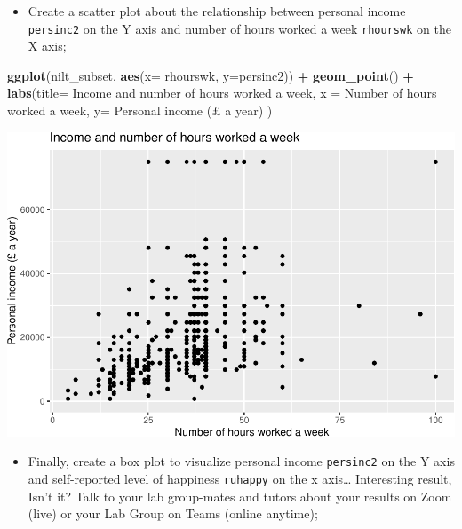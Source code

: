 \documentclass[
]{book}
\newenvironment{Shaded}{\begin{snugshade}}{\end{snugshade}}
\newcommand{\AttributeTok}[1]{\textcolor[rgb]{0.13,0.29,0.53}{#1}}
\newcommand{\FunctionTok}[1]{\textcolor[rgb]{0.13,0.29,0.53}{\textbf{#1}}}
\newcommand{\NormalTok}[1]{#1}
\newcommand{\SpecialCharTok}[1]{\textcolor[rgb]{0.81,0.36,0.00}{\textbf{#1}}}
\newcommand{\StringTok}[1]{\textcolor[rgb]{0.31,0.60,0.02}{#1}}
\providecommand{\tightlist}{%
  \setlength{\itemsep}{0pt}\setlength{\parskip}{0pt}}
\begin{document}
\begin{itemize}
\tightlist
\item
  Create a scatter plot about the relationship between personal income \texttt{persinc2} on the Y axis and number of hours worked a week \texttt{rhourswk} on the X axis;
\end{itemize}

\begin{Shaded}
\begin{Highlighting}[]
\FunctionTok{ggplot}\NormalTok{(nilt\_subset, }\FunctionTok{aes}\NormalTok{(}\AttributeTok{x=}\NormalTok{ rhourswk, }\AttributeTok{y=}\NormalTok{persinc2)) }\SpecialCharTok{+}
  \FunctionTok{geom\_point}\NormalTok{() }\SpecialCharTok{+}
  \FunctionTok{labs}\NormalTok{(}\AttributeTok{title=} \StringTok{\textquotesingle{}Income and number of hours worked a week\textquotesingle{}}\NormalTok{,}
       \AttributeTok{x =} \StringTok{\textquotesingle{}Number of hours worked a week\textquotesingle{}}\NormalTok{, }\AttributeTok{y=} \StringTok{\textquotesingle{}Personal income (£ a year)\textquotesingle{}}\NormalTok{ )}
\end{Highlighting}
\end{Shaded}

\begin{flushleft}\includegraphics[width=1\linewidth]{lab-workbook_files/figure-latex/unnamed-chunk-130-1} \end{flushleft}

\begin{itemize}
\tightlist
\item
  Finally, create a box plot to visualize personal income \texttt{persinc2} on the Y axis and self-reported level of happiness \texttt{ruhappy} on the x axis\ldots{} Interesting result, Isn't it? Talk to your lab group-mates and tutors about your results on Zoom (live) or your Lab Group on Teams (online anytime);
\end{itemize}
\end{document}
